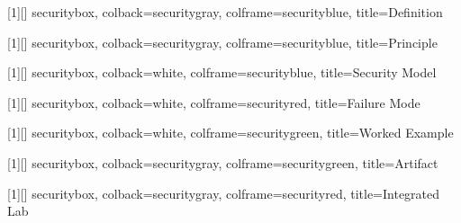 \newcommand{\booktitle}{Blockchain Security from First Principles}

\newcommand{\state}{S}
\newcommand{\nextstate}{S'}
\newcommand{\transition}{\delta}
\newcommand{\inputevent}{I}
\newcommand{\reachable}{\mathsf{Reachable}}
\newcommand{\valid}{\mathsf{Valid}}
\newcommand{\verify}{\mathsf{Verify}}
\newcommand{\sign}{\mathsf{Sign}}
\newcommand{\commit}{\mathsf{Commit}}
\newcommand{\prove}{\mathsf{Prove}}
\newcommand{\hash}{\mathsf{H}}
\newcommand{\domain}{\mathsf{Domain}}

\newcommand{\boxheading}[2]{#1\ifstrempty{#2}{}{: #2}}



[1][]{
  securitybox,
  colback=securitygray,
  colframe=securityblue,
  title={\boxheading{Definition}{#1}}
}

[1][]{
  securitybox,
  colback=securitygray,
  colframe=securityblue,
  title={\boxheading{Principle}{#1}}
}

[1][]{
  securitybox,
  colback=white,
  colframe=securityblue,
  title={\boxheading{Security Model}{#1}}
}

[1][]{
  securitybox,
  colback=white,
  colframe=securityred,
  title={\boxheading{Failure Mode}{#1}}
}

[1][]{
  securitybox,
  colback=white,
  colframe=securitygreen,
  title={\boxheading{Worked Example}{#1}}
}

[1][]{
  securitybox,
  colback=securitygray,
  colframe=securitygreen,
  title={\boxheading{Artifact}{#1}}
}

[1][]{
  securitybox,
  colback=securitygray,
  colframe=securityred,
  title={\boxheading{Integrated Lab}{#1}}
}

